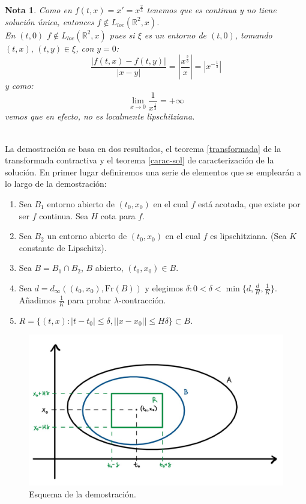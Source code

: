 \documentclass[11pt, a4paper,twoside]{article}
\makeatletter
\theoremstyle{theorem-style}  %
\renewenvironment{proof}[1][\proofname]{\par
	\pushQED{\qed}%
	\normalfont \topsep6\p@\@plus6\p@\relax
	\list{}{%
		\settowidth{\leftmargin}{\quad:\hskip\labelsep}%
		\setlength{\labelwidth}{0pt}%
		\setlength{\itemindent}{-\leftmargin}%
	}%
	\item[\hskip\labelsep\itshape#1\@addpunct{:}]\ignorespaces
}{%
	\popQED\endlist\@endpefalse
}
\theoremstyle{definition-style}
\newtheorem*{note}{Nota} %
\theoremstyle{example-style}
\providecommand{\abs}[1]{\left\lvert#1\right\rvert} %
\makeatother
\begin{document}
\begin{note}
	Como en $f(t, x) = x' = x^{\frac{2}{3}}$ tenemos que es continua y no tiene solución única, entonces $f \notin L_{loc}(\mathbb{R}^2,x)$. \\
	En $(t, 0)$ $f \notin L_{loc}(\mathbb{R}^2,x)$ pues si $\xi$ es un entorno de $(t, 0)$, tomando $(t, x), \, (t, y) \in \xi$, con $y=0$:
	\[\frac{\abs{f(t, x) - f(t, y)}}{\abs{x - y}} = \abs{\frac{x^{\frac{2}{3}}}{x}} = \abs{x^{-\frac{1}{3}}}\]
	y como:
	\[\lim\limits_{x \to 0} \frac{1}{x^{\frac{1}{3}}} = +\infty\] 
	vemos que en efecto, no es localmente lipschitziana.
\end{note}
\begin{proof}\ \\
	La demostración se basa en dos resultados, el teorema \ref{transformada} de la transformada contractiva y el teorema \ref{carac-sol} de caracterización de la solución. En primer lugar definiremos una serie de elementos que se emplearán a lo largo de la demostración:
	\begin{enumerate}
		\item Sea $ B_1 $  entorno abierto de $ (t_0,x_0) $ en el cual $ f $ está acotada, que existe por ser $ f $ continua. Sea $ H $ cota para $ f $.
		
		\item Sea $ B_2 $ un entorno abierto de $ (t_0,x_0) $ en el cual $ f $ es lipschitziana. (Sea $ K $ constante de Lipschitz).
		
		\item Sea $ B=B_1 \cap B_2 $, $ B $ abierto, $ (t_0,x_0) \in B$.
		
		\item Sea $ d=d_\infty((t_0,x_0),\text{Fr}(B)) $ y elegimos $ \delta : 0<\delta <\min \{d,\frac{d}{H},\frac{1}{K}\} $. Añadimos $ \frac{1}{K} $ para probar $ \lambda $-contracción.
		\item  $ R=\{(t,x) : |t-t_0|\leq \delta, ||x-x_0||\leq H\delta \}\subset B $.
	\end{enumerate}
	
	\begin{figure}[h]
		\centering
		\includegraphics[scale=0.3]{picard}
		\caption{Esquema de la demostración.}
	\end{figure}
	

\end{proof}
\end{document}
